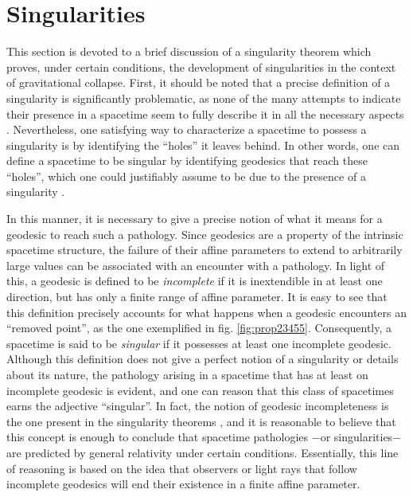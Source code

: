 \documentclass[
12pt,		%
openright,	%
twoside,  %
a4paper,			%
chapter=TITLE,		%
english,			%
french,				%
spanish,			%
brazil				%
]{USPSC-classe/USPSC}
\begin{document}
\section{Singularities}\label{sing}

This section is devoted to a brief discussion of a singularity theorem which proves, under certain conditions, the development of singularities in the context of gravitational collapse. First, it should be noted that a precise definition of a singularity is significantly problematic, as none of the many attempts to indicate their presence in a spacetime seem to fully describe it in all the necessary aspects \cite{Wald1984}. Nevertheless, one satisfying way to characterize a spacetime to possess a singularity is by identifying the “holes” it leaves behind. In other words, one can define a spacetime to be singular by identifying geodesics that reach these “holes”, which one could justifiably assume to be due to the presence of a singularity \cite{Geroch1968}. 

In this manner, it is necessary to give a precise notion of what it means for a geodesic to reach such a pathology. Since geodesics are a property of the intrinsic spacetime structure, the failure of their affine parameters to extend to arbitrarily large values can be associated with an encounter with a pathology. In light of this, a geodesic is defined to be \textit{incomplete} if it is inextendible in at least one direction, but has only a finite range of affine parameter. It is easy to see that this definition precisely accounts for what happens when a geodesic encounters an ``removed point'', as the one exemplified in fig. \ref{fig:prop23455}. Consequently, a spacetime is said to be \textit{singular} if it possesses at least one incomplete geodesic. Although this definition does not give a perfect notion of a singularity or details about its nature, the pathology arising in a spacetime that has at least on incomplete geodesic is evident, and one can reason that this class of spacetimes earns the adjective “singular”. In fact, the notion of geodesic incompleteness is the one present in the singularity theorems \cite{Hawking1973}, and it is reasonable to believe that this concept is enough to conclude that spacetime pathologies $-$or singularities$-$ are predicted by general relativity under certain conditions. Essentially, this line of reasoning is based on the idea that observers or light rays that follow incomplete geodesics will end their existence in a finite affine parameter.
\end{document}

